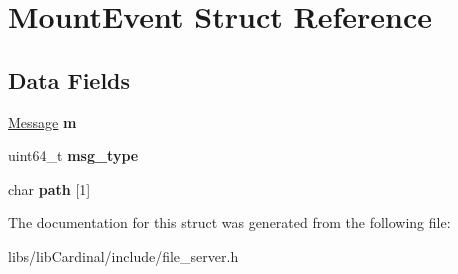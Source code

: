 \hypertarget{structMountEvent}{}\section{Mount\+Event Struct Reference}
\label{structMountEvent}
\subsection*{Data Fields}
\begin{DoxyCompactItemize}
\item 
\hyperlink{structMessage}{Message} {\bfseries m}\hypertarget{structMountEvent_a12d5a59ce14b3286229fa4ce2f852ba4}{}\label{structMountEvent_a12d5a59ce14b3286229fa4ce2f852ba4}

\item 
uint64\+\_\+t {\bfseries msg\+\_\+type}\hypertarget{structMountEvent_a022ed906ae6c1f0f612b9f54e1542d6d}{}\label{structMountEvent_a022ed906ae6c1f0f612b9f54e1542d6d}

\item 
char {\bfseries path} \mbox{[}1\mbox{]}\hypertarget{structMountEvent_a65f1cb9113e5020ed57028fa50f64c85}{}\label{structMountEvent_a65f1cb9113e5020ed57028fa50f64c85}

\end{DoxyCompactItemize}


The documentation for this struct was generated from the following file\+:\begin{DoxyCompactItemize}
\item 
libs/lib\+Cardinal/include/file\+\_\+server.\+h\end{DoxyCompactItemize}
